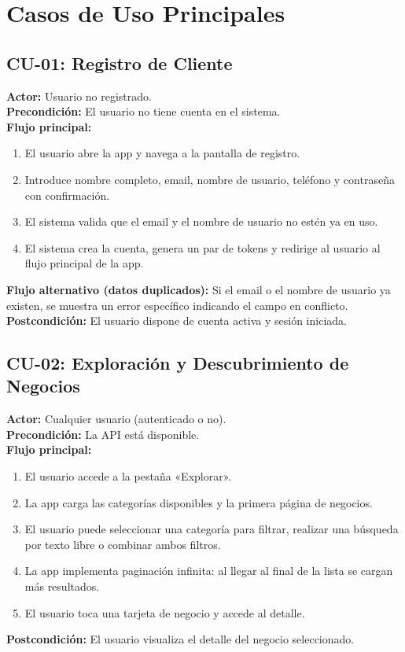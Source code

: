 \documentclass[12pt,a4paper,twoside]{report}
\begin{document}
\section{Casos de Uso Principales}

\subsection{CU-01: Registro de Cliente}

\begin{tcolorbox}[definicionStyle, title={CU-01 — Registro de Cliente}]
\textbf{Actor:} Usuario no registrado. \\
\textbf{Precondición:} El usuario no tiene cuenta en el sistema. \\
\textbf{Flujo principal:}
\begin{enumerate}
  \item El usuario abre la app y navega a la pantalla de registro.
  \item Introduce nombre completo, email, nombre de usuario, teléfono y contraseña con confirmación.
  \item El sistema valida que el email y el nombre de usuario no estén ya en uso.
  \item El sistema crea la cuenta, genera un par de tokens y redirige al usuario al flujo principal de la app.
\end{enumerate}
\textbf{Flujo alternativo (datos duplicados):} Si el email o el nombre de usuario ya existen, se muestra un error específico indicando el campo en conflicto. \\
\textbf{Postcondición:} El usuario dispone de cuenta activa y sesión iniciada.
\end{tcolorbox}

\subsection{CU-02: Exploración y Descubrimiento de Negocios}

\begin{tcolorbox}[definicionStyle, title={CU-02 — Exploración de Negocios}]
\textbf{Actor:} Cualquier usuario (autenticado o no). \\
\textbf{Precondición:} La API está disponible. \\
\textbf{Flujo principal:}
\begin{enumerate}
  \item El usuario accede a la pestaña «Explorar».
  \item La app carga las categorías disponibles y la primera página de negocios.
  \item El usuario puede seleccionar una categoría para filtrar, realizar una búsqueda por texto libre o combinar ambos filtros.
  \item La app implementa paginación infinita: al llegar al final de la lista se cargan más resultados.
  \item El usuario toca una tarjeta de negocio y accede al detalle.
\end{enumerate}
\textbf{Postcondición:} El usuario visualiza el detalle del negocio seleccionado.
\end{tcolorbox}
\end{document}
